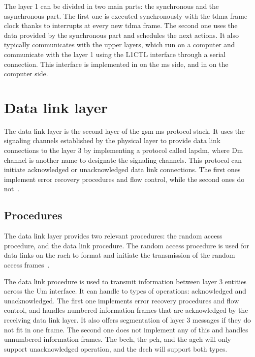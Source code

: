     The layer 1 can be divided in two main parts: the synchronous and
    the asynchronous part. The first one is executed synchronously with
    the \gls{tdma} frame clock thanks to interrupts at every new
    \gls{tdma} frame. The second one uses the data provided by the
    synchronous part and schedules the next actions. It also typically
    communicates with the upper layers, which run on a computer and
    communicate with the layer 1 using the L1CTL interface through a
    serial connection. This interface is implemented in
     on the \gls{ms} side,
    and in  on the computer
    side.

\section{Data link layer}

  The data link layer is the second layer of the \gls{gsm} \gls{ms}
  protocol stack. It uses the signaling channels established by the
  physical layer to provide data link connections to the layer 3 by
  implementing a protocol called \gls{lapdm}, where Dm channel is
  another name to designate the signaling channels. This protocol can
  initiate acknowledged or unacknowledged data link connections. The
  first ones implement error recovery procedures and flow control, while
  the second ones do not~\cite{3gpp_ts_2014-5}.   

  \subsection{Procedures}

  The data link layer provides two relevant procedures: the random
  access procedure, and the data link procedure. The random access
  procedure is used for data links on the \gls{rach} to format and
  initiate the transmission of the random access frames~\cite{3gpp_ts_2014-5}.

  The data link procedure is used to transmit information between layer
  3 entities across the Um interface. It can handle to types of
  operations: acknowledged and unacknowledged. The first one implements
  error recovery procedures and flow control, and handles numbered
  information frames that are acknowledged by the receiving data link
  layer. It also offers segmentation of layer 3 messages if they do not
  fit in one frame. The second one does not implement any of this and
  handles unnumbered information frames. The \gls{bcch}, the \gls{pch},
  and the \gls{agch} will only support unacknowledged operation, and the
  \gls{dcch} will support both types.

